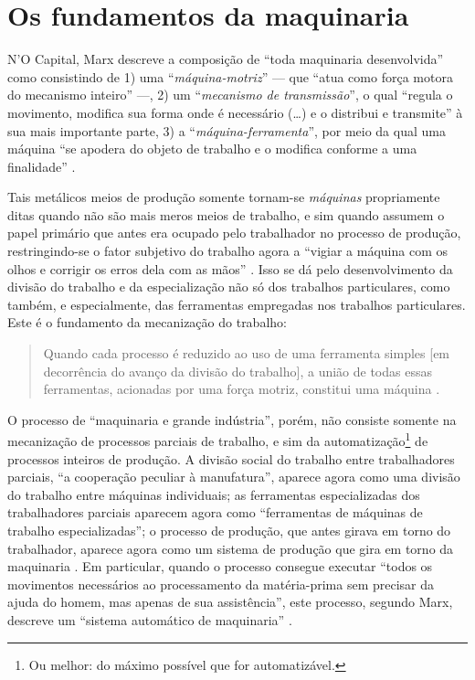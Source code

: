 \documentclass[12pt]{article}
\title{}
\author{}
\date{2026-06-07}
\numberwithin{equation}{section}
\theoremstyle{plain}
\theoremstyle{definition}
\theoremstyle{remark}
\begin{document}
\maketitle

\hypertarget{os-fundamentos-da-maquinaria}{%
\section{Os fundamentos da maquinaria}\label{os-fundamentos-da-maquinaria}}

N'O Capital, Marx descreve a composição de ``toda maquinaria desenvolvida'' como consistindo de 1) uma ``\emph{máquina-motriz}'' --- que ``atua como força motora do mecanismo inteiro'' ---, 2) um ``\emph{mecanismo de transmissão}'', o qual ``regula o movimento, modifica sua forma onde é necessário (\ldots) e o distribui e transmite'' à sua mais importante parte, 3) a ``\emph{máquina-ferramenta}'', por meio da qual uma máquina ``se apodera do objeto de trabalho e o modifica conforme a uma finalidade'' \parencite[p. 446-7, grifo meu]{Marx2017}.

Tais metálicos meios de produção somente tornam-se \emph{máquinas} propriamente ditas quando não são mais meros meios de trabalho, e sim quando assumem o papel primário que antes era ocupado pelo trabalhador no processo de produção, restringindo-se o fator subjetivo do trabalho agora a ``vigiar a máquina com os olhos e corrigir os erros dela com as mãos'' \parencite[p. 448]{Marx2017}. Isso se dá pelo desenvolvimento da divisão do trabalho e da especialização não só dos trabalhos particulares, como também, e especialmente, das ferramentas empregadas nos trabalhos particulares. Este é o fundamento da mecanização do trabalho:

\begin{quote}
Quando cada processo é reduzido ao uso de uma ferramenta simples {[}em decorrência do avanço da divisão do trabalho{]}, a união de todas essas ferramentas, acionadas por uma força motriz, constitui uma máquina \parencite[p. 136 (§167)]{Babbage2009}.
\end{quote}

O processo de ``maquinaria e grande indústria'', porém, não consiste somente na mecanização de processos parciais de trabalho, e sim da automatização\footnote{Ou melhor: do máximo possível que for automatizável.} de processos inteiros de produção. A divisão social do trabalho entre trabalhadores parciais, ``a cooperação peculiar à manufatura'', aparece agora como uma divisão do trabalho entre máquinas individuais; as ferramentas especializadas dos trabalhadores parciais aparecem agora como ``ferramentas de máquinas de trabalho especializadas''; o processo de produção, que antes girava em torno do trabalhador, aparece agora como um sistema de produção que gira em torno da maquinaria \parencite[p. 453]{Marx2017}. Em particular, quando o processo consegue executar ``todos os movimentos necessários ao processamento da matéria-prima sem precisar da ajuda do homem, mas apenas de sua assistência'', este processo, segundo Marx, descreve um ``sistema automático de maquinaria'' \parencite[p. 455]{Marx2017}.
\end{document}

